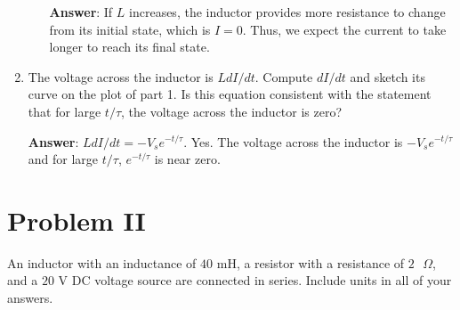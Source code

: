 \documentclass{article}
\begin{document}
\begin{enumerate}
\begin{itemize}
                \ifsolutions
                \textbf{Answer}: If $L$ increases, the inductor provides more resistance to change from its initial state, which is $I=0$. Thus, we expect the current to take longer to reach its final state.
                \else
                \vskip 24pt
                \fi

    \end{itemize}

  \item The voltage across the inductor is $LdI/dt$. Compute $dI/dt$ and sketch its curve on the plot of part 1. Is this equation consistent with the statement that for large $t/\tau$, the voltage across the inductor is zero?

        \ifsolutions
        \textbf{Answer}: $LdI/dt = -V_se^{-t/\tau}$. Yes. The voltage across the inductor is $-V_se^{-t/\tau}$ and for large $t/\tau$, $e^{-t/\tau}$ is near zero.
        \else

        \newpage
        \fi

\end{enumerate}

\section{Problem II}

An inductor with an inductance of $40\text{ mH}$, a resistor with a resistance of $2\text{ }\Omega$, and a $20\text{ V}$ DC voltage source are connected in series. Include units in all of your answers.
\end{document}
